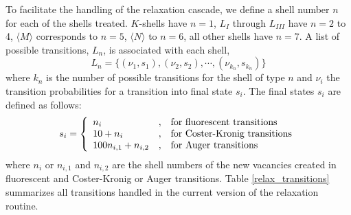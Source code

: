 To facilitate the handling of the relaxation cascade, we
define a shell number $n$ for each of the shells treated.
$K$-shells have $n=1$, $L_I$ through $L_{III}$ have $n=2$ to 4,
$\langle M \rangle$ corresponds to $n=5$, $\langle N \rangle$ to
$n=6$, all other shells have $n=7$. A list of possible
transitions, $L_n$, is associated with each shell,
\begin{equation}
L_n = \{ (\nu_1, s_1), (\nu_2, s_2), \cdots, (\nu_{k_n}, s_{k_n}) \}
\end{equation}
where $k_n$ is the number of possible transitions for the shell
of type $n$ and $\nu_i$ the transition probabilities for
a transition into final state $s_i$.  The final states
$s_i$ are defined as follows:
\begin{equation}
s_i =
\left\{
\begin{array}{l@{\quad , \quad}l}
n_i & \mbox{for fluorescent transitions} \\
10 + n_i & \mbox{for Coster-Kronig transitions} \\
100 n_{i,1} + n_{i,2} & \mbox{for Auger transitions}
\end{array}
\right.
\end{equation}
where $n_i$ or $n_{i,1}$ and $n_{i,2}$ are the shell numbers of the
new vacancies created in fluorescent and Coster-Kronig or Auger transitions.
Table \ref{relax_transitions}
summarizes all transitions handled in the current version
of the relaxation routine.
